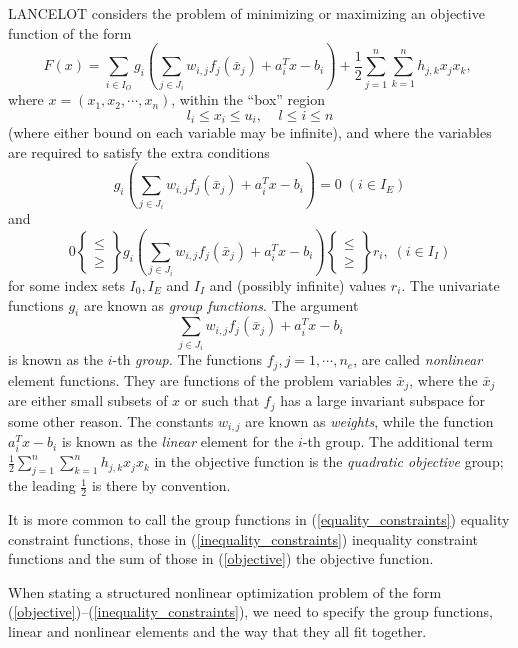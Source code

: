 \documentclass[a4paper]{article}
\newcommand{\beqn}[1]{\begin{equation}\label{#1}}
\newcommand{\eeqn}{\end{equation}}
\newcommand{\req}[1]{(\ref{#1})}
\newcommand{\ms}{\;\;\;\;}
\newcommand{\sfrac}[2]{{\scriptstyle \frac{#1}{#2}}}
\newcommand{\half}{\sfrac{1}{2}}
\begin{document}
{\sf LANCELOT} considers the problem of minimizing or maximizing
an objective function
of the form
\beqn{objective}
F( x )
= \sum_{i \in I_O}g_i \left (
\sum_{j \in J_i} w_{i,j} f_j (\bar{x}_j) +  a_i^T x  - b_i  \right)
+ \half \sum_{j=1}^n \sum_{k=1}^n h_{j,k} x_j x_k ,
\;
\eeqn
where $x = (x_1, x_2,\cdots, x_n)$, within the ``box'' region
\beqn{box}
l_i \leq x_i \leq u_i, \ms l \leq i \leq n
\eeqn
(where either bound on each variable may be  infinite),  and where the
variables are required to satisfy the extra conditions
\beqn{equality_constraints}
g_i \left(
\sum_{j \in J_{i}} w_{i,j}f_j (\bar{x}_j) + a_i^T x - b_i  \right) = 0
\; (i \in I_E)
\eeqn
and
\beqn{inequality_constraints}
0 \left \{ \begin{array}{ll}
           \leq \\ \geq
           \end{array} \right\}
g_i \left(
\sum_{j \in J_{i}} w_{i,j} f_j(\bar{x}_j) + a_i^T x - b_i \right)
\left\{ \begin{array}{ll}
\leq \\ \geq
\end{array} \right\}
 r_i,
\; (i \in I_I)
\eeqn
for some index  sets  $I_0, I_E$  and $I_I$   and  (possibly infinite)
values $r_i$.  The univariate functions $g_i$ are known as  {\em group
functions}.
The argument
\[ \sum_{j \in J_i} w_{i,j} f_j(\bar{x}_j) + a_i^T x - b_i \]
is known as  the  $i$-th {\em  group.}
The functions $f_j, j=1,\cdots,
n_e$, are  called   {\em  nonlinear} element functions.
 They are  functions of the  problem  variables
$\bar{x}_j$, where  the
$\bar{x}_j$ are either small subsets of  $x$ or such  that $f_j$ has a
large invariant   subspace
for  some other  reason.  The  constants  $w_{i,j}$ are  known as {\em
weights}, while
the function $a_i^T  x -  b_i$  is known  as the {\em linear}
element for the $i$-th group.
The additional term $\half \sum_{j=1}^n \sum_{k=1}^n h_{j,k} x_j x_k$
in the objective function is the {\em quadratic objective} group; the
leading $\half$ is there by convention.

It    is    more  common    to     call   the   group    functions
in \req{equality_constraints}  equality  constraint functions,
those   in
\req{inequality_constraints} inequality constraint functions
and the sum of those
in \req{objective} the objective function.

When   stating a  structured  nonlinear optimization  problem    of  the  form
\req{objective}--\req{inequality_constraints}, we  need to  specify  the group
functions,
linear and nonlinear elements
and the way that they all fit together.
\end{document}
